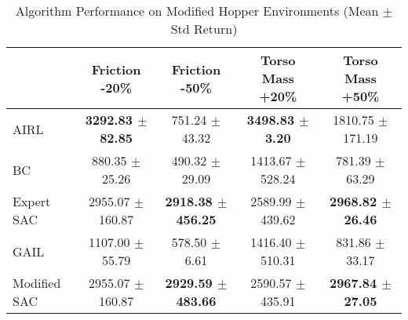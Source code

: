 \documentclass{article}
\begin{document}
\pagestyle{empty}

\begin{table}
\caption{Algorithm Performance on Modified Hopper Environments (Mean $\pm$ Std Return)}
\label{tab:perf_mod_hopper}
\begin{adjustbox}{max width=\textwidth, center}
\begin{tabular}{lcccc}
\toprule
 & Friction -20\% & Friction -50\% & Torso Mass +20\% & Torso Mass +50\% \\
\midrule
AIRL & \textbf{3292.83 $\pm$ 82.85} & 751.24 $\pm$ 43.32 & \textbf{3498.83 $\pm$ 3.20} & 1810.75 $\pm$ 171.19 \\
BC & 880.35 $\pm$ 25.26 & 490.32 $\pm$ 29.09 & 1413.67 $\pm$ 528.24 & 781.39 $\pm$ 63.29 \\
Expert SAC & 2955.07 $\pm$ 160.87 & \textbf{2918.38 $\pm$ 456.25} & 2589.99 $\pm$ 439.62 & \textbf{2968.82 $\pm$ 26.46} \\
GAIL & 1107.00 $\pm$ 55.79 & 578.50 $\pm$ 6.61 & 1416.40 $\pm$ 510.31 & 831.86 $\pm$ 33.17 \\
Modified SAC & 2955.07 $\pm$ 160.87 & \textbf{2929.59 $\pm$ 483.66} & 2590.57 $\pm$ 435.91 & \textbf{2967.84 $\pm$ 27.05} \\
\bottomrule
\end{tabular}
\end{adjustbox}
\end{table}
\end{document}
